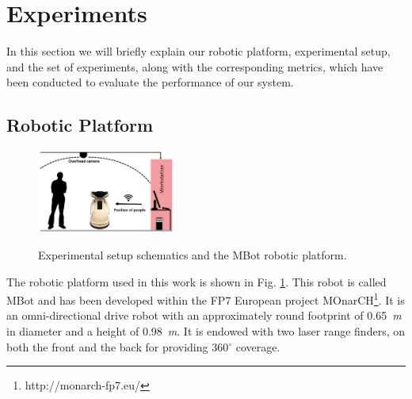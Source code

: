 \section{Experiments}
\label{exp}
In this section we will briefly explain our robotic platform, experimental setup, and the set of experiments, along with the corresponding metrics, which have been conducted to evaluate the performance of our system.

\subsection{Robotic Platform}
\label{sec:robot}

\begin{figure}
\centering
\includegraphics[width=0.4\textwidth]{pictures/setup.jpg}\label{fig:robot}%
\caption{Experimental setup schematics and the MBot robotic platform.}
\label{fig:setup}
\end{figure}





The robotic platform used in this work is shown in Fig. \ref{fig:setup}. This robot is called MBot \cite{Messias2014robotic} and has been developed within the FP7 European project MOnarCH\footnote{http://monarch-fp7.eu/}.
It is an omni-directional drive robot with an approximately round footprint of 0.65~\textit{m} in diameter and a height of 0.98~\textit{m}.
It is endowed with two laser range finders, on both the front and the back for providing 360$^{\circ}$ coverage.

